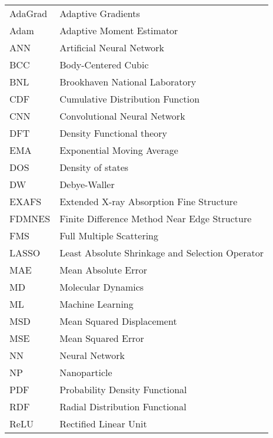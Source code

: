 \begin{table}[h]
    \begin{tabular}{ll} 
    AdaGrad & Adaptive Gradients                            \\
    Adam  &  Adaptive Moment Estimator                      \\
    ANN   & Artificial Neural Network                       \\
    BCC   &   Body-Centered Cubic                           \\
    BNL   & Brookhaven National Laboratory                  \\
    CDF   & Cumulative Distribution Function                \\
    CNN   & Convolutional Neural Network                    \\
    DFT   & Density Functional theory                       \\
    EMA   & Exponential Moving Average                      \\
    DOS   & Density of states                               \\
    DW    & Debye-Waller                                    \\
    EXAFS & Extended X-ray Absorption Fine Structure        \\
    FDMNES & Finite Difference Method Near Edge Structure   \\
    FMS   & Full Multiple Scattering                        \\
    LASSO & Least Absolute Shrinkage and Selection Operator \\
    MAE   & Mean Absolute Error                             \\
    MD    & Molecular Dynamics                              \\
    ML    & Machine Learning                                \\
    MSD   & Mean Squared Displacement                       \\
    MSE   & Mean Squared Error                              \\
    NN    & Neural Network                                  \\
    NP    & Nanoparticle                                    \\
    PDF   & Probability Density Functional                  \\
    RDF   & Radial Distribution Functional                  \\
    ReLU  & Rectified Linear Unit                           \\

\end{tabular}
\end{table}
